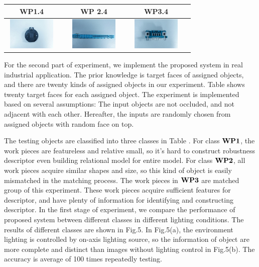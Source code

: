 \documentclass[journal]{IEEEtran}
\begin{document}
\begin{table}[!t]
\begin{center}
\begin{tabular}{|c|c||c|c||c|c|}
\hline
WP1.4 & & WP 2.4 & & WP3.4 &\\
\hline
\includegraphics[width=1in,height=0.6in]{j_img/wp14.jpg} & 
 & 
\includegraphics[width=1in,height=0.6in]{j_img/wp24.jpg} & 
 &
\includegraphics[width=1in,height=0.6in]{j_img/wp34.jpg} & 
\\ 
\hline
\end{tabular}
\end{center}
\end{table}

For the second part of experiment, we implement the proposed system in real industrial application. The prior knowledge is target faces of assigned objects, and there are twenty kinds of assigned objects in our experiment. Table \uppercase\expandafter{} shows twenty target faces for each assigned object. The experiment is implemented based on several assumptions: The input objects are not occluded, and not adjacent with each other. Hereafter, the inputs are randomly chosen from assigned objects with random face on top. 

The testing objects are classified into three classes in Table \uppercase\expandafter{}. For class $\bf{WP1}$, the work pieces are featureless and relative small, so it's hard to construct robustness descriptor even building relational model for entire model. For class $\bf{WP2}$, all work pieces acquire similar shapes and size, so this kind of object is easily mismatched in the matching process. The work pieces in $\bf{WP3}$ are matched group of this experiment. These work pieces acquire sufficient features for descriptor, and have plenty of information for identifying and constructing descriptor. In the first stage of experiment, we compare the performance of proposed system between different classes in different lighting conditions.  The results of different classes are shown in Fig.5. In Fig.5(a), the environment lighting is controlled by on-axis lighting source, so the information of object are more complete and distinct than images without lighting control in Fig.5(b). The accuracy is average of 100 times repeatedly testing.
\end{document}
